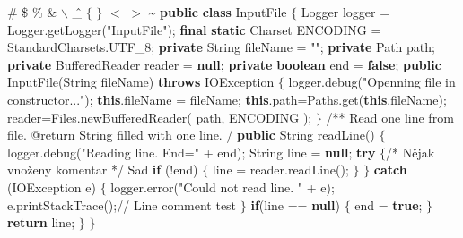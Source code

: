 \bigbreak
\begingroup\typoscale[800/10]
\localcolor
{} \# \$ \% \& $\backslash$ \^ \_ $\{$ $\}$  $<$ $>$ \~\codetexNewline
{} {\bf {\Blue public}} {\bf {\Blue class}} InputFile $\{$\codetexNewline
{} Logger logger = Logger.getLogger({\Yellow "InputFile"});\codetexNewline
{} {\bf {\Blue final}} {\bf {\Blue static}} Charset ENCODING = StandardCharsets.UTF\_8;\codetexNewline
{} \codetexNewline
{} {\bf {\Blue private}} String fileName = {\Yellow ""};\codetexNewline
{} {\bf {\Blue private}} Path path;\codetexNewline
{} {\bf {\Blue private}} BufferedReader reader = {\bf {\Blue null}};\codetexNewline
{} {\bf {\Blue private}} {\bf {\Blue boolean}} end = {\bf {\Blue false}};\codetexNewline
{} \codetexNewline
{} {\bf {\Blue public}} InputFile(String fileName) {\bf {\Blue throws}} IOException $\{$\codetexNewline
{} logger.debug({\Yellow "Openning file in constructor..."});\codetexNewline
{} {\bf {\Blue this}}.fileName = fileName;\codetexNewline
{} {\bf {\Blue this}}.path=Paths.get({\bf {\Blue this}}.fileName);\codetexNewline
{} reader=Files.newBufferedReader( path, ENCODING );\codetexNewline
{} $\}$\codetexNewline
{} \codetexNewline
{} {\Grey /**}\codetexNewline
{} {\Grey * Read one line from file.}\codetexNewline
{} {\Grey *}\codetexNewline
{} {\Grey * @return String filled with one line.}\codetexNewline
{} {\Grey */}\codetexNewline
{} {\bf {\Blue public}} String readLine() $\{$\codetexNewline
{} logger.debug({\Yellow "Reading line. End="} + end);\codetexNewline
{} String line = {\bf {\Blue null}};\codetexNewline
{} \codetexNewline
{} {\bf {\Blue try}} $\{${\Grey /* Nějak vnoženy}\codetexNewline
{} {\Grey komentar */} Sad\codetexNewline
{} {\bf {\Blue if}} (!end) $\{$\codetexNewline
{} line = reader.readLine();\codetexNewline
{} $\}$\codetexNewline
{} $\}$ {\bf {\Blue catch}} (IOException e) $\{$\codetexNewline
{} logger.error({\Yellow "Could not read line. "} + e);\codetexNewline
{} e.printStackTrace();{\Grey // Line comment test}\codetexNewline
{} $\}$\codetexNewline
{} \codetexNewline
{} {\bf {\Blue if}}(line == {\bf {\Blue null}}) $\{$\codetexNewline
{} end = {\bf {\Blue true}};\codetexNewline
{} $\}$\codetexNewline
{} \codetexNewline
{} {\bf {\Blue return}} line;\codetexNewline
{} $\}$\codetexNewline
{} $\}$\codetexNewline
\endgroup
\bigbreak

